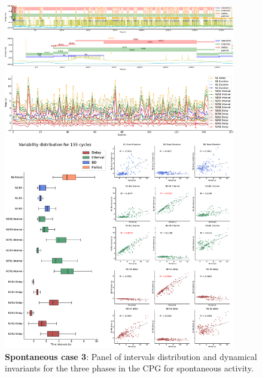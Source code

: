 \begin{figure}[htbp]
	\centering
	\includegraphics[width=0.9\textwidth]{./img/invariants/data/SUSSEX/prep1/images/3phases/panel_with_intervals.pdf}
	\caption{\textbf{Spontaneous case 3}: Panel of intervals distribution and dynamical invariants for the three phases in the CPG for spontaneous activity.}
	\label{fig:prep1 invariants}
\end{figure}


